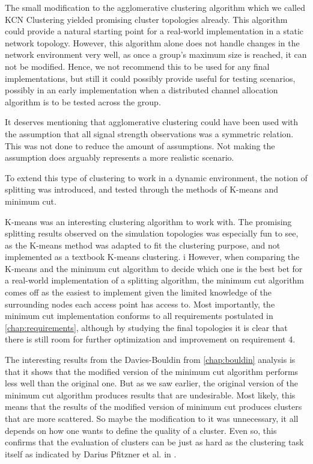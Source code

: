The small modification to the agglomerative clustering algorithm which we called KCN Clustering yielded promising cluster topologies already.
This algorithm could provide a natural starting point for a real-world implementation in a static network topology.
However, this algorithm alone does not handle changes in the network environment very well, as once a group's maximum size is reached, it can not be modified. 
Hence, we not recommend this to be used for any final implementations, but still it could possibly provide useful for testing scenarios, possibly in an early
implementation when a distributed channel allocation algorithm is to be tested across the group.

It deserves mentioning that agglomerative clustering could have been used with the assumption that all signal strength observations was a symmetric relation.
This was not done to reduce the amount of assumptions. Not making the assumption does arguably represents a more realistic scenario. 

To extend this type of clustering to work in a dynamic environment, the notion of splitting was introduced, and tested through the methods of K-means and minimum cut.

K-means was an interesting clustering algorithm to work with. The promising splitting results observed on the simulation topologies was especially fun to see, as
the K-means method was adapted to fit the clustering purpose, and not implemented as a textbook K-means clustering.
i
However, when comparing the K-means and the minimum cut algorithm to decide which one is the best bet for a real-world implementation of a splitting algorithm,
the minimum cut algorithm comes off as the easiest to implement given the limited knowledge of the surrounding nodes each access point has access to.
Most importantly, the minimum cut implementation conforms to all requirements postulated in \ref{chap:requirements}, although by studying the
final topologies it is clear that there is still room for further optimization and improvement on requirement 4. 

The interesting results from the Davies-Bouldin from \ref{chap:bouldin} analysis is that it shows that the modified version of the minimum cut algorithm performs less well than the original one.  
But as we saw earlier, the original version of the minimum cut algorithm produces results that are undesirable. Most likely, this means that the results
of the modified version of minimum cut produces clusters that are more scattered. So maybe the modification to it was unnecessary, it all depends on how one wants
to define the quality of a cluster. Even so, this confirms that the evaluation of clusters can be just as hard as the clustering task itself as indicated by Darius Pfitzner et al. in \cite{fitzner}.



